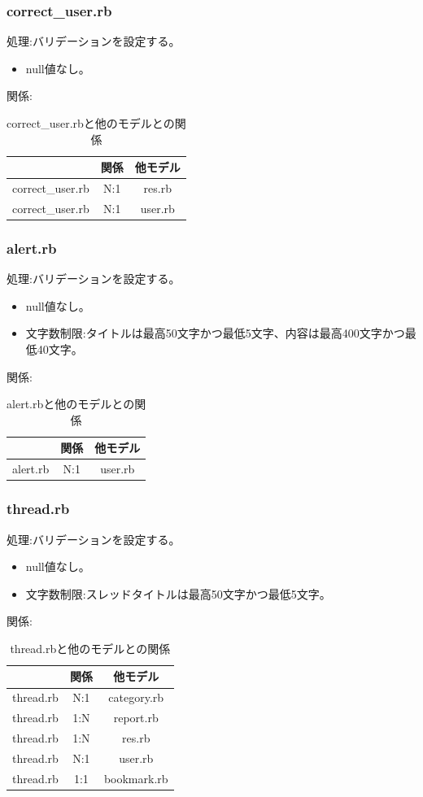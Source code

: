 \documentclass[a4j]{jarticle}
\begin{document}
\subsubsection{correct\_user.rb}
\noindent
処理:バリデーションを設定する。
\begin{itemize}
  \item null値なし。
\end{itemize}
関係:
\begin{table}[H]
  \centering
  \caption{correct\_user.rbと他のモデルとの関係}
  \begin{tabular}{|c|c|c|}\hline
    & 関係 & 他モデル\\ \hline \hline
    correct\_user.rb & N:1 & res.rb \\ \hline
    correct\_user.rb & N:1 & user.rb \\ \hline
  \end{tabular}
\end{table}


\subsubsection{alert.rb}
\noindent
処理:バリデーションを設定する。
\begin{itemize}
  \item null値なし。
  \item 文字数制限:タイトルは最高50文字かつ最低5文字、内容は最高400文字かつ最低40文字。
\end{itemize}
関係:
\begin{table}[H]
  \centering
  \caption{alert.rbと他のモデルとの関係}
  \begin{tabular}{|c|c|c|}\hline
    & 関係 & 他モデル\\ \hline \hline
    alert.rb & N:1 & user.rb \\ \hline
  \end{tabular}
\end{table}

\subsubsection{thread.rb}
\noindent
処理:バリデーションを設定する。
\begin{itemize}
  \item null値なし。
  \item 文字数制限:スレッドタイトルは最高50文字かつ最低5文字。
\end{itemize}
関係:
\begin{table}[H]
  \centering
  \caption{thread.rbと他のモデルとの関係}
  \begin{tabular}{|c|c|c|}\hline
    & 関係 & 他モデル\\ \hline \hline
    thread.rb & N:1 & category.rb \\ \hline
    thread.rb & 1:N & report.rb \\ \hline
    thread.rb & 1:N & res.rb \\ \hline
    thread.rb & N:1 & user.rb \\ \hline
    thread.rb & 1:1 & bookmark.rb \\ \hline
  \end{tabular}
\end{table}
\end{document}
